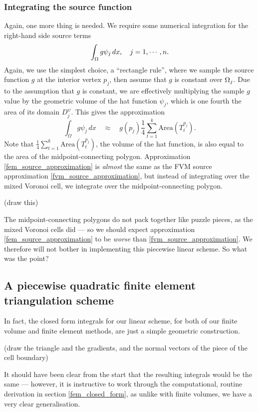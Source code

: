 \subsubsection{Integrating the source function}
Again, one more thing is needed.
We require some numerical integration for the right-hand side source terms
    $$\int_{\Omega}g\psi_j\,dx, \text{\quad $j=1,\cdots,n$}.$$
Again, we use the simplest choice, a ``rectangle rule'', where we sample the source function $g$ at the interior vertex
$p_j$, then assume that $g$ is constant over ${\Omega}_j$.
Due to the assumption that $g$ is constant, we are effectively multiplying the sample $g$ value by the geometric volume of the hat function $\psi_j$,
which is one fourth the area of its domain $D^\psi_j$.
This gives the approximation
\begin{equation}\label{fem_source_approximation}
    \int_{\Omega}g\psi_j\,dx \quad\approx\quad g(p_j)\frac{1}{4}\sum_{t=1}^k\text{Area}(T^{p_j}_t).
\end{equation}
Note that $\frac{1}{4}\sum_{t=1}^k\text{Area}(T^{p_j}_t)$, the volume of the hat function, is also equal to the
area of the midpoint-connecting polygon.
Approximation \eqref{fem_source_approximation} is \textit{almost} the same as the FVM source approximation \eqref{fvm_source_approximation},
but instead of integrating over the mixed Voronoi cell, we integrate over the midpoint-connecting polygon.

\vskip 0.2in
(draw this)
\vskip 0.2in

The midpoint-connecting polygons do not pack together like puzzle pieces, as the mixed Voronoi cells did --- so we should expect
approximation \eqref{fem_source_approximation} to be \textit{worse} than \eqref{fvm_source_approximation}.
We therefore will not bother in implementing this piecewise linear scheme.
So what was the point?

\subsection{A piecewise quadratic finite element triangulation scheme}
In fact, the closed form integrals for our linear scheme, for both of our finite volume
and finite element methods, are just a simple geometric construction.

\vskip 0.2in
(draw the triangle and the gradients, and the normal vectors of the piece of the cell boundary)
\vskip 0.2in

It should have been clear from the start that the resulting integrals would be the same --- however, it is instructive to work through
the computational, routine derivation in section \ref{fem_closed_form}, as unlike with finite volumes, we have a very clear generalisation.

